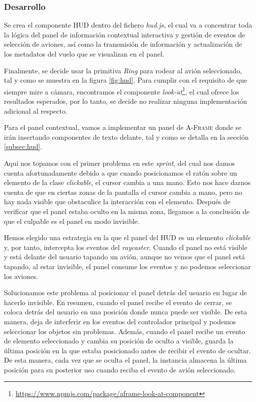 \documentclass[a4paper, 11pt]{book}
\begin{document}
\subsubsection{Desarrollo}
Se crea el componente \textsc{\gls{HUD}} dentro del fichero \emph{hud.js}, el cual va a concentrar toda la lógica del panel de información contextual interactiva y gestión de eventos de selección de aviones, así como la transmisión de información y actualización de los metadatos del vuelo que se visualizan en el panel. 

Finalmente, se decide usar la primitiva \emph{Ring} para rodear al avión seleccionado, tal y como se muestra en la figura \ref{fig:hud}. Para cumplir con el requisito de que siempre mire a cámara, encontramos el componente \emph{look-at}\footnote{\url{https://www.npmjs.com/package/aframe-look-at-component}}, el cual ofrece los resultados esperados, por lo tanto, se decide no realizar ninguna implementación adicional al respecto.

Para el panel contextual, vamos a implementar un panel de \textsc{A-Frame} donde se irán insertando componentes de texto delante, tal y como se detalla en la sección \ref{subsec:hud}. 

Aquí nos topamos con el primer problema en este \emph{sprint}, del cual nos damos cuenta afortunadamente debido a que cuando posicionamos el ratón sobre un elemento de la clase \emph{clickable}, el cursor cambia a una mano. Esto nos hace darnos cuenta de que en ciertas zonas de la pantalla el cursor cambia a mano, pero no hay nada visible que obstaculice la interacción con el elemento. Después de verificar que el panel estaba oculto en la misma zona, llegamos a la conclusión de que el culpable es el panel en modo invisible.

Hemos elegido una estrategia en la que el panel del \textsc{\gls{HUD}} es un elemento \emph{clickable} y, por tanto, intercepta los eventos del \emph{\gls{raycaster}}. Cuando el panel no está visible y está delante del usuario tapando un avión, aunque no vemos que el panel está tapando, al estar invisible, el panel consume los eventos y no podemos seleccionar los aviones.

Solucionamos este problema al posicionar el panel detrás del usuario en lugar de hacerlo invisible. En resumen, cuando el panel recibe el evento de cerrar, se coloca detrás del usuario en una posición donde nunca puede ser visible. De esta manera, deja de interferir en los eventos del controlador principal y podemos seleccionar los objetos sin problemas.
Además, cuando el panel recibe un evento de elemento seleccionado y cambia su posición de oculto a visible, guarda la última posición en la que estaba posicionado antes de recibir el evento de ocultar. De esta manera, cada vez que se oculta el panel, la instancia almacena la última posición para su posterior uso cuando reciba el evento de avión seleccionado.
\end{document}
